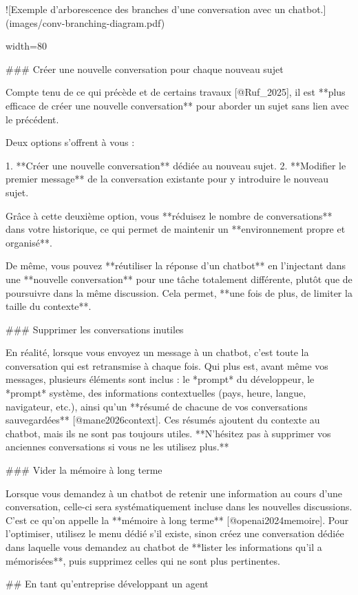 ![Exemple d'arborescence des branches d'une conversation avec un chatbot.](images/conv-branching-diagram.pdf){width=80%

### Créer une nouvelle conversation pour chaque nouveau sujet

Compte tenu de ce qui précède et de certains travaux [@Ruf_2025], il est **plus efficace de créer une nouvelle conversation** pour aborder un sujet sans lien avec le précédent.

Deux options s'offrent à vous :

1. **Créer une nouvelle conversation** dédiée au nouveau sujet.
2. **Modifier le premier message** de la conversation existante pour y introduire le nouveau sujet.

Grâce à cette deuxième option, vous **réduisez le nombre de conversations** dans votre historique, ce qui permet de maintenir un **environnement propre et organisé**.

De même, vous pouvez **réutiliser la réponse d'un chatbot** en l'injectant dans une **nouvelle conversation** pour une tâche totalement différente, plutôt que de poursuivre dans la même discussion.
Cela permet, **une fois de plus, de limiter la taille du contexte**.

### Supprimer les conversations inutiles

En réalité, lorsque vous envoyez un message à un chatbot, c'est toute la conversation qui est retransmise à chaque fois. Qui plus est, avant même vos messages, plusieurs éléments sont inclus : le *prompt* du développeur, le *prompt* système, des informations contextuelles (pays, heure, langue, navigateur, etc.), ainsi qu'un **résumé de chacune de vos conversations sauvegardées** [@mane2026context]. Ces résumés ajoutent du contexte au chatbot, mais ils ne sont pas toujours utiles. **N'hésitez pas à supprimer vos anciennes conversations si vous ne les utilisez plus.**

### Vider la mémoire à long terme

Lorsque vous demandez à un chatbot de retenir une information au cours d'une conversation, celle-ci sera systématiquement incluse dans les nouvelles discussions. C'est ce qu'on appelle la **mémoire à long terme** [@openai2024memoire]. Pour l'optimiser, utilisez le menu dédié s'il existe, sinon créez une conversation dédiée dans laquelle vous demandez au chatbot de **lister les informations qu'il a mémorisées**, puis supprimez celles qui ne sont plus pertinentes.

## En tant qu'entreprise développant un agent

}
